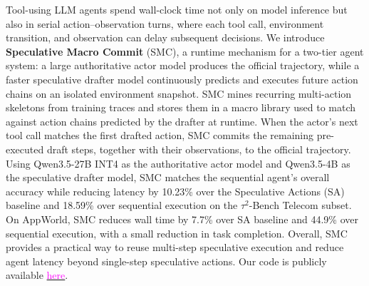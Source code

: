 Tool-using LLM agents spend wall-clock time not only on model inference but also in serial action--observation turns, where each tool call, environment transition, and observation can delay subsequent decisions. 
We introduce \textbf{Speculative Macro Commit} (SMC), a runtime mechanism for a two-tier agent system: a large authoritative actor model produces the official trajectory, while a faster speculative drafter model continuously predicts and executes future action chains on an isolated environment snapshot.
SMC mines recurring multi-action skeletons from training traces and stores them in a macro library used to match against action chains predicted by the drafter at runtime.
When the actor's next tool call matches the first drafted action, SMC commits the remaining pre-executed draft steps, together with their observations, to the official trajectory.
Using Qwen3.5-27B INT4 as the authoritative actor model and Qwen3.5-4B as the speculative drafter model, SMC matches the sequential agent's overall accuracy while reducing latency by 10.23\% over the Speculative Actions (SA) baseline and 18.59\% over sequential execution on the $\tau^2$-Bench Telecom subset. 
On AppWorld, SMC reduces wall time by 7.7\% over SA baseline and 44.9\% over sequential execution, with a small reduction in task completion. 
Overall, SMC provides a practical way to reuse multi-step speculative execution and reduce agent latency beyond single-step speculative actions. Our code is publicly available \href{https://github.com/zeyuliu1037/speculative-macro-commit}{\textcolor{magenta}{here}}.